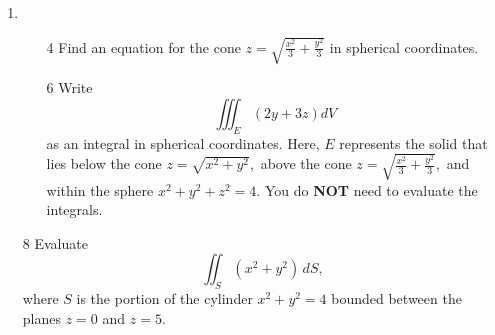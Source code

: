 \documentclass[addpoints,12pt]{exam}
\begin{document}
\begin{enumerate}
\newpage
\item
\begin{itemize}
\item[4] Find an equation for the cone $z = \sqrt{\frac{x^2}{3}+ \frac{y^2}{3}}$ in spherical
coordinates.
\vfill
\item[6] Write
$$\displaystyle\iiint_{E} (2y+3z) dV$$
as an integral in spherical coordinates. Here, $E$ represents the solid that lies below the cone
$z= \sqrt{x^2+y^2},$ above the cone $z = \sqrt{\frac{x^2}{3}+ \frac{y^2}{3}},$ and within the
sphere $x^2+y^2+z^2 = 4.$ You do \textbf{NOT} need to evaluate the integrals.
\vfill
\end{itemize}
\newpage
\item[8] Evaluate
\[
\iint_S (x^2 + y^2)\, dS,
\]
where \( S \) is the portion of the cylinder \( x^2 + y^2 = 4 \) bounded between the planes \( z = 0
\) and \( z = 5 \).
\end{enumerate}
\end{document}
